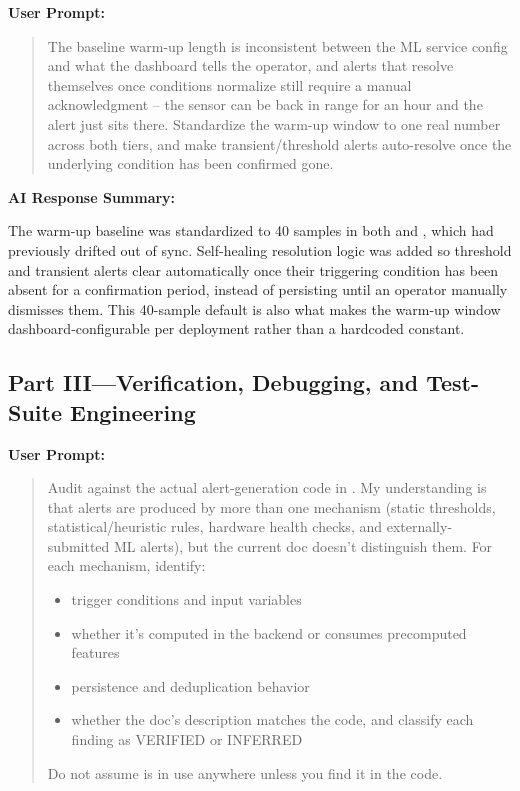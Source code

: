 \documentclass[conference]{IEEEtran}
\begin{document}
\noindent\textbf{User Prompt:}\par

\begin{quote}
The baseline warm-up length is inconsistent between the ML service config and what the dashboard tells the operator, and alerts that resolve themselves once conditions normalize still require a manual acknowledgment -- the sensor can be back in range for an hour and the alert just sits there. Standardize the warm-up window to one real number across both tiers, and make transient/threshold alerts auto-resolve once the underlying condition has been confirmed gone.
\end{quote}

\noindent\textbf{AI Response Summary:}\par

The warm-up baseline was standardized to 40 samples in both \texttt{} and \texttt{}, which had previously drifted out of sync. Self-healing resolution logic was added so threshold and transient alerts clear automatically once their triggering condition has been absent for a confirmation period, instead of persisting until an operator manually dismisses them. This 40-sample default is also what makes the warm-up window dashboard-configurable per deployment rather than a hardcoded constant.

\subsection*{Part III---Verification, Debugging, and Test-Suite Engineering}

\par\vspace{4pt}\par\vspace{2pt}

\noindent\textbf{User Prompt:}\par

\begin{quote}
Audit \texttt{} against the actual alert-generation code in \texttt{}. My understanding is that alerts are produced by more than one mechanism (static thresholds, statistical/heuristic rules, hardware health checks, and externally-submitted ML alerts), but the current doc doesn't distinguish them. For each mechanism, identify:
\begin{itemize}
\setlength{\itemsep}{1pt}
\item trigger conditions and input variables
\item whether it's computed in the backend or consumes precomputed features
\item persistence and deduplication behavior
\item whether the doc's description matches the code, and classify each finding as VERIFIED or INFERRED
\end{itemize}
Do not assume \texttt{} is in use anywhere unless you find it in the code.
\end{quote}
\end{document}
